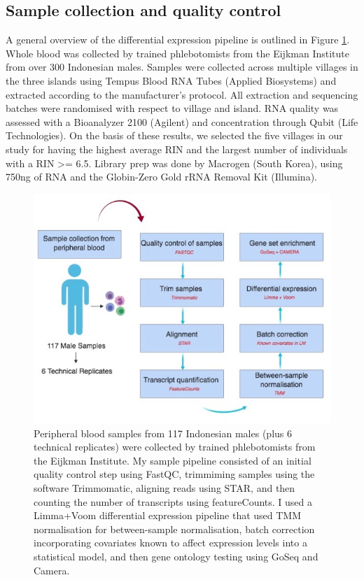 \documentclass[12pt,a4paper,titlepage,twoside,openright]{book}
\begin{document}
\begin{mainmatter}
{\section{Sample collection and quality control}
A general overview of the differential expression pipeline is outlined in Figure \ref{fig:Study Pipeline}. Whole blood was collected by trained phlebotomists from the Eijkman Institute from over 300 Indonesian males. Samples were collected across multiple villages in the three islands using Tempus Blood RNA Tubes (Applied Biosystems) and extracted according to the manufacturer's protocol. All extraction and sequencing batches were randomised with respect to village and island. RNA quality was assessed with a Bioanalyzer 2100 (Agilent) and concentration through Qubit (Life Technologies). On the basis of these results, we selected the five villages in our study for having the highest average RIN and the largest number of individuals with a RIN >= 6.5. Library prep was done by Macrogen (South Korea), using 750ng of RNA and the Globin-Zero Gold rRNA Removal Kit (Illumina). 

\begin{figure}[htb!]
\centering
\includegraphics[width=\textwidth,height=\textheight,keepaspectratio]{Figures/SamplePipeline.jpg}
\caption{Peripheral blood samples from 117 Indonesian males (plus 6 technical replicates) were collected by trained phlebotomists from the Eijkman Institute. My sample pipeline consisted of an initial quality control step using FastQC, trimmiming samples using the software Trimmomatic, aligning reads using STAR, and then counting the number of transcripts using featureCounts. I used a Limma+Voom differential expression pipeline that used TMM normalisation for between-sample normalisation, batch correction incorporating covariates known to affect expression levels into a statistical model, and then gene ontology testing using GoSeq and Camera.}
\label{fig:Study Pipeline}
\end{figure}

}
\end{mainmatter}
\end{document}
